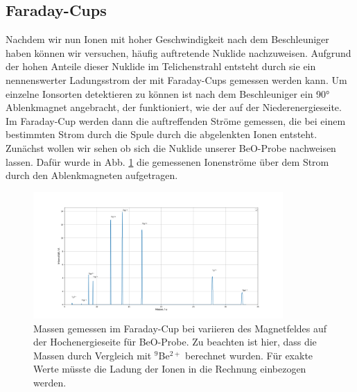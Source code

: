 \subsection{Faraday-Cups}
Nachdem wir nun Ionen mit hoher Geschwindigkeit nach dem Beschleuniger haben können wir versuchen, häufig auftretende Nuklide nachzuweisen.
Aufgrund der hohen Anteile dieser Nuklide im Telichenstrahl entsteht durch sie ein nennenswerter Ladungsstrom der mit Faraday-Cups gemessen werden kann.
Um einzelne Ionsorten detektieren zu können ist nach dem Beschleuniger ein \ang{90} Ablenkmagnet angebracht, der funktioniert, wie der auf der Niederenergieseite.
Im Faraday-Cup werden dann die auftreffenden Ströme gemessen, die bei einem bestimmten Strom durch die Spule durch die abgelenkten Ionen entsteht.
Zunächst wollen wir sehen ob sich die Nuklide unserer BeO-Probe nachweisen lassen.
Dafür wurde in Abb. \ref{Auswertung_Bild_Faraday_Cup_BeO_HE} die gemessenen Ionenströme über dem Strom durch den Ablenkmagneten aufgetragen.
\begin{figure}[ht]
	\centering
           \includegraphics[width=0.85\textwidth]{Pictures/HEMass60-140pos153BeOTUDPract.png}
	\caption{Massen gemessen im Faraday-Cup bei variieren des Magnetfeldes auf der Hochenergieseite für BeO-Probe. Zu beachten ist hier, dass die Massen durch Vergleich mit $^{9}$Be$^{2+}$ berechnet wurden. Für exakte Werte müsste die Ladung der Ionen in die Rechnung einbezogen werden.}
	\label{Auswertung_Bild_Faraday_Cup_BeO_HE}
\end{figure}

